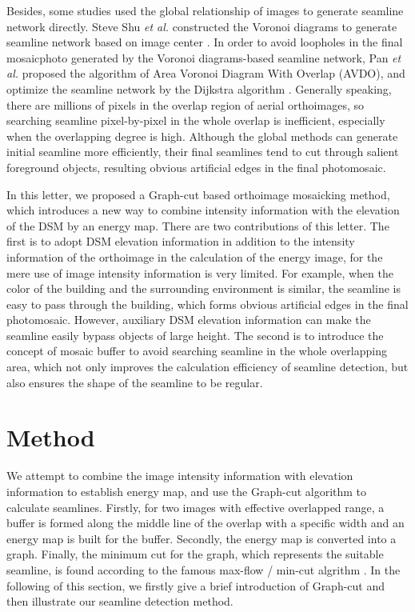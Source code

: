 \documentclass[journal]{IEEEtran}
\begin{document}
Besides, some studies used the global relationship of images to generate seamline network directly. Steve Shu \textit{et al.} constructed the Voronoi diagrams to generate seamline network based on image center \cite{Hsu2002}. In order to avoid loopholes in the final mosaicphoto generated by the Voronoi diagrams-based seamline network, Pan \textit{et al.} proposed the algorithm of Area Voronoi Diagram With Overlap (AVDO), and optimize the seamline network by the Dijkstra algorithm \cite{Pan2009,Pan2014a}. Generally speaking, there are millions of pixels in the overlap region of aerial orthoimages, so searching seamline pixel-by-pixel in the whole overlap is inefficient, especially when the overlapping degree is high. Although the global methods can generate initial seamline more efficiently, their final seamlines tend to cut through salient foreground objects, resulting obvious artificial edges in the final photomosaic. 

In this letter, we proposed a Graph-cut based orthoimage mosaicking method, which introduces a new way to combine intensity information with the elevation of the DSM by an energy map. There are two contributions of this letter. The first is to adopt DSM elevation information in addition to the intensity information of the orthoimage in the calculation of the energy image, for the mere use of image intensity information is very limited. For example, when the color of the building and the surrounding environment is similar, the seamline is easy to pass through the building, which forms obvious artificial edges in the final photomosaic. However, auxiliary DSM elevation information can make the seamline easily bypass objects of large height. The second is to introduce the concept of mosaic buffer to avoid searching seamline in the whole overlapping area, which not only improves the calculation efficiency of seamline detection, but also ensures the shape of the seamline to be regular.

\section{Method}
We attempt to combine the image intensity information with elevation information to establish energy map, and use the Graph-cut algorithm to calculate seamlines. Firstly, for two images with effective overlapped range, a buffer is formed along the middle line of the overlap with a specific width and an energy map is built for the buffer. Secondly, the energy map is converted into a graph. Finally, the minimum cut for the graph, which represents the suitable seamline, is found according to the famous max-flow / min-cut algrithm \cite{Boykov2004}. In the following of this section, we firstly give a brief introduction of Graph-cut and then illustrate our seamline detection method.\par
\end{document}
